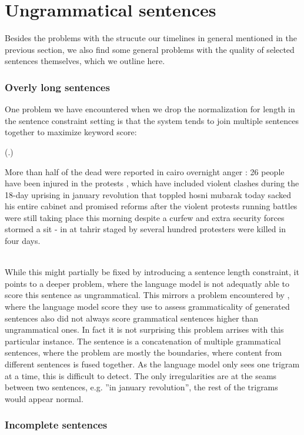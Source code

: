 \documentclass[a4paper,BCOR=10mm]{report}
\newcounter{quotecount}[chapter]
\newcommand{\countquote}[1]{\vspace{1cm}\refstepcounter{quotecount}%
     (\thechapter.\arabic{quotecount}) \hspace*{1cm} \parbox{9cm}{#1}\\[1cm]}
\numberwithin{lemma}{chapter}
\numberwithin{definition}{chapter}
\begin{document}
\section{Ungrammatical sentences}

Besides the problems with the strucute our timelines in general mentioned in the previous section, we also find some general problems with the quality of selected sentences themselves, which we outline here.

\subsubsection{Overly long sentences}

One problem we have encountered when we drop the normalization for length in the sentence constraint setting is that the system tends to join multiple sentences together to maximize keyword score:

\countquote{
More than half of the dead were reported in cairo overnight anger : 26 people have been injured in the protests , which have included violent clashes during the 18-day uprising in january revolution that toppled hosni mubarak today sacked his entire cabinet and promised reforms after the violent protests running battles were still taking place this morning despite a curfew and extra security forces stormed a sit - in at tahrir staged by several hundred protesters were killed in four days.
}

While this might partially be fixed by introducing a sentence length constraint, it points to a deeper problem, where the language model is not adequatly able to score this sentence as ungrammatical.
This mirrors a problem encountered by \citet{mckeown}, where the language model score they use to assess grammaticality of generated sentences also did not always score grammatical sentences higher than ungrammatical ones. In fact it is not surprising this problem arrises with this particular instance. The sentence is a concatenation of multiple grammatical sentences, where the problem are mostly the boundaries, where content from different sentences is fused together. As the language model only sees one trigram at a time, this is difficult to detect. The only irregularities are at the seams between two sentences, e.g. ''in january revolution'', the rest of the trigrams would appear normal.

\subsubsection{Incomplete sentences}
\end{document}
